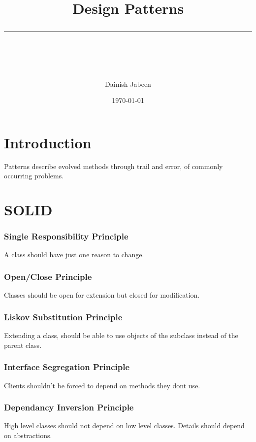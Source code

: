 \documentclass[11pt]{scrartcl} %
\title{	
	\normalfont\normalsize
	\vspace{20pt} %
	{\huge Design Patterns}\\ %
	\vspace{12pt} %
	\rule{\linewidth}{2pt}\\ %
}
\author{\small Dainish Jabeen} %
\date{\normalsize\today} %
\begin{document}
\maketitle %

\section{Introduction}

Patterns describe evolved methods through trail and error, of commonly occurring problems.

\section{SOLID}

\subsubsection{Single Responsibility Principle}

A class should have just one reason to change.

\subsubsection{Open/Close Principle}

Classes should be open for extension but closed for modification.

\subsubsection{Liskov Substitution Principle}

Extending a class, should be able to use objects of the subclass instead of the parent class.

\subsubsection{Interface Segregation Principle}

Clients shouldn't be forced to depend on methods they dont use.

\subsubsection{Dependancy Inversion Principle}

High level classes should not depend on low level classes. Details should depend on abstractions.
\end{document}
